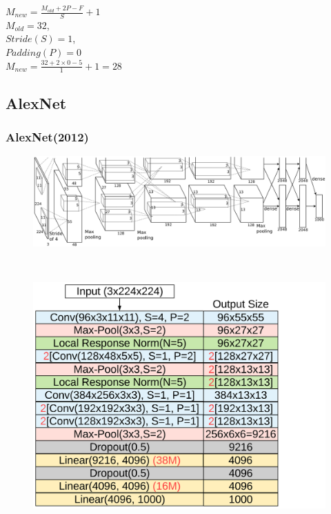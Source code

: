 \documentclass[9pt]{beamer}
\begin{document}
\begin{frame}
\begin{minipage}[t]{0.40\textwidth}
	$M_{new} = \frac{M_{old} + 2P - F}{S} + 1$ \\
	\small $M_{old} = 32$, \\ 
	\small $Stride(S) = 1$, \\ 
	\small $Padding(P) = 0$ \\
	\small $M_{new} = \frac{32 + 2\times0 - 5}{1} + 1 = 28$ 
	\end{minipage} 
\end{frame}

\subsection{AlexNet}
\begin{frame}
	\frametitle{AlexNet(2012)}
	\begin{minipage}[t]{\textwidth}	
		\begin{figure}[t]
			\includegraphics[scale=0.18]{./figures/edit/alexnet_original.png}
		\end{figure}
	\end{minipage}	\\
	\begin{minipage}[t]{0.35\textwidth}	
		\begin{figure}[t]
			\includegraphics[scale=0.045]{./figures/edit/alexnet.png}

\end{figure}
\end{minipage}
\end{frame}
\end{document}
